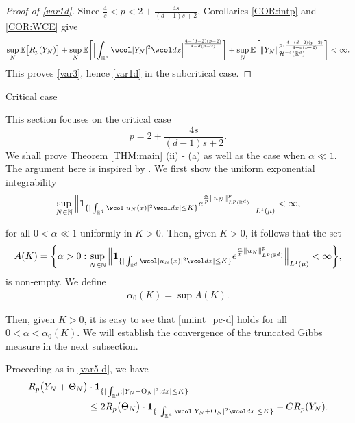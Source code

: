 \documentclass[%
11pt,  reqno]{amsart}
\makeatletter
\theoremstyle{remarkstyle}
\newcommand{\1}{\hspace{0.2mm}\text{I}\hspace{0.2mm}}
\newcommand{\noi}{\noindent}
\newcommand{\R}{\mathbb{R}}
\newcommand{\E}{\mathbb{E}}
\newcommand{\al}{\alpha}
\newcommand{\dl}{\delta}
\newcommand{\wick}[1]{\wcol#1\wcol}
\newcommand{\ind}{\mathbf 1}
\numberwithin{equation}{section}
\numberwithin{theorem}{section}
\def\subsubsection{\@startsection{subsubsection}{3}%
	\z@{.5\linespacing\@plus.7\linespacing}{-.5em}%
	{\normalfont\bfseries}}
\makeatother
\begin{document}
\begin{proof}[Proof of \eqref{var1d}]
		\noi
		Since $\frac{4}{s}<p<2+\frac{4s}{(d-1)s+2}$, Corollaries \ref{COR:intp} and \ref{COR:WCE} give
		$$
		\sup_N \E\big[ R_p(Y_N) \big] + \sup_N \E \bigg[ \Big| \int_{{\R^d}} \wick{|Y_N|^2}  dx   \Big|^{\frac{4-(d-2)(p-2)}{4-d(p-2)}} \bigg] + \sup_N \E \bigg[   \| Y_N \|_{\mathcal H^{-\dl} ({\R^d})}^{p_1 \frac{4-(d-2)(p-2)}{4-d(p-2)}}  \bigg] <\infty.
		$$
		This proves \eqref{var3}, hence \eqref{var1d} in the subcritical case.
	\end{proof}
	
	
	\subsubsection{Critical case}
	\label{SUB:cri}
	~~~
	
	
	
	This section focuses on the critical case 
	$$p = 2+ \frac{4s}{(d-1)s+2}.$$ 
	We shall prove Theorem \ref{THM:main} (ii) - (a) as well as the case when $\al \ll 1$.
	The argument here is inspired by \cite{OOT,OOT1}.  
	We first show the uniform exponential integrability 
	\begin{align}
		\label{uniint_pc-d}
		\sup_{N \in \mathbb N} \Big\|  \ind_{ \{ | \int_{\R^d} \wick{ | u_N (x)|^2 } dx | \le K\}}  e^{\frac{\al} p{\| u_N \|_{L^p (\R^d)}^p}} \Big\|_{L^1 (\mu)}   < \infty ,
	\end{align}
	
	\noi 
	for all $0 < \al \ll 1$ uniformly in $K > 0$. Then, given $K >0$, it follows that the set
	\[
	A (K) = \bigg\{ \al > 0 : \sup_{N \in \mathbb N} \Big\|  \ind_{ \{ | \int_{\R^d} \wick{ | u_N (x)|^2 } dx | \le K\}}  e^{\frac{\al} p{\| u_N \|_{L^p (\R^d)}^p}} \Big\|_{L^1 (\mu)}   < \infty \bigg\},
	\]
	is non-empty.
	We define
	\begin{align}
		\label{threshold-d}
		\al_0 (K) = \sup A (K).
	\end{align}
	
	\noi 
	Then, given $K > 0$, it is easy to see that \eqref{uniint_pc-d} holds for all $0 < \al < \al_0 (K)$.
	We will establish the convergence of the truncated Gibbs measure in the next subsection.
	
	Proceeding as in \eqref{var5-d}, we have
	\begin{align}
		\begin{split}
			R_p \big(Y_N + \Theta_N\big) 
			&\cdot  \ind_{\{ | \int_{\R^d} : |Y_N + \Theta_N|^2 : dx | \le K  \}} \\
			&  \le 2 R_p \big(\Theta_N\big) 
			\cdot  \ind_{\{ | \int_{\R^d} \wick{ |Y_N + \Theta_N|^2 } dx | \le K  \}} + C R_p(Y_N).
		\end{split}
		\label{CN0-d}
	\end{align}
	
\end{document}
